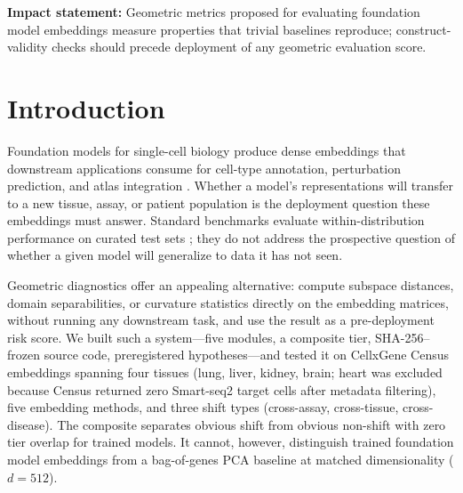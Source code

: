 \documentclass[9pt,lineno]{elife}
\begin{document}
\noindent\textbf{Impact statement:} Geometric metrics proposed for evaluating foundation model embeddings measure properties that trivial baselines reproduce; construct-validity checks should precede deployment of any geometric evaluation score.


\section{Introduction}

Foundation models for single-cell biology produce dense embeddings that downstream applications consume for cell-type annotation, perturbation prediction, and atlas integration \citep{theodoris2023geneformer, cui2024scgpt, rosen2026uce}. Whether a model's representations will transfer to a new tissue, assay, or patient population is the deployment question these embeddings must answer. Standard benchmarks evaluate within-distribution performance on curated test sets \citep{luecken2022scib, wu2025scfm}; they do not address the prospective question of whether a given model will generalize to data it has not seen.

Geometric diagnostics offer an appealing alternative: compute subspace distances, domain separabilities, or curvature statistics directly on the embedding matrices, without running any downstream task, and use the result as a pre-deployment risk score. We built such a system---five modules, a composite tier, SHA-256--frozen source code, preregistered hypotheses---and tested it on CellxGene Census embeddings spanning four tissues (lung, liver, kidney, brain; heart was excluded because Census returned zero Smart-seq2 target cells after metadata filtering), five embedding methods, and three shift types (cross-assay, cross-tissue, cross-disease). The composite separates obvious shift from obvious non-shift with zero tier overlap for trained models. It cannot, however, distinguish trained foundation model embeddings from a bag-of-genes PCA baseline at matched dimensionality ($d = 512$).
\end{document}
